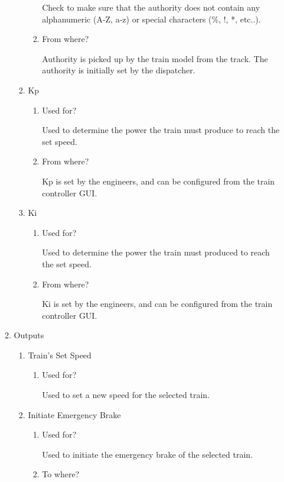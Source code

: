 \documentclass[11pt]{article}
\begin{document}
\begin{enumerate}
\begin{enumerate}
\begin{enumerate}
\begin{enumerate}
Check to make sure that the authority does not contain any alphanumeric (A-Z, a-z) or special characters (\%, !, *, etc..).
\item From where?
\label{sec-3-1-5-8-1-3-3}

Authority is picked up by the train model from the track. The authority is initially set by the dispatcher.
\end{enumerate}
\item Kp
\label{sec-3-1-5-8-1-4}
\begin{enumerate}
\item Used for?
\label{sec-3-1-5-8-1-4-1}

Used to determine the power the train must produce to reach the set speed. 
\item From where?
\label{sec-3-1-5-8-1-4-2}

Kp is set by the engineers, and can be configured from the train controller GUI.
\end{enumerate}
\item Ki
\label{sec-3-1-5-8-1-5}
\begin{enumerate}
\item Used for?
\label{sec-3-1-5-8-1-5-1}

Used to determine the power the train must produced to reach the set speed.  
\item From where?
\label{sec-3-1-5-8-1-5-2}

Ki is set by the engineers, and can be configured from the train controller GUI.
\end{enumerate}
\end{enumerate}
\item Outputs
\label{sec-3-1-5-8-2}
\begin{enumerate}
\item Train's Set Speed
\label{sec-3-1-5-8-2-1}
\begin{enumerate}
\item Used for?
\label{sec-3-1-5-8-2-1-1}

Used to set a new speed for the selected train.
\end{enumerate}
\item Initiate Emergency Brake
\label{sec-3-1-5-8-2-2}
\begin{enumerate}
\item Used for?
\label{sec-3-1-5-8-2-2-1}

Used to initiate the emergency brake of the selected train.
\item To where?
\label{sec-3-1-5-8-2-2-2}


\end{enumerate}
\end{enumerate}
\end{enumerate}
\end{enumerate}
\end{document}
